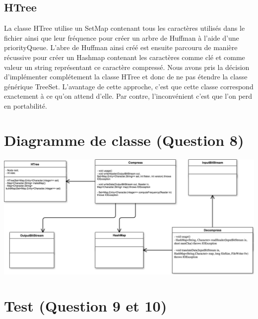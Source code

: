 \documentclass[10pt,a4paper]{article}
\begin{document}
\subsection*{HTree}
La classe HTree utilise un SetMap contenant tous les caractères utilisés dans le fichier ainsi que leur fréquence pour créer un arbre de Huffman à l'aide d'une priorityQueue. L'abre de Huffman ainsi créé est ensuite parcouru de manière récussive pour créer un Hashmap contenant les caractères comme clé et comme valeur un string représentant ce caractère compressé.
Nous avons pris la décision d'implémenter complétement la classe HTree et donc de ne pas étendre la classe générique TreeSet. L'avantage de cette approche, c'est que cette classe correspond exactement à ce qu'on attend d'elle. Par contre, l'inconvénient c'est que l'on perd en portabilité.


\section*{Diagramme de classe (Question 8)}
\begin{center}
    \includegraphics[scale=0.5]{UML.png}
\end{center}

\section*{Test (Question 9 et 10)}
\end{document}
